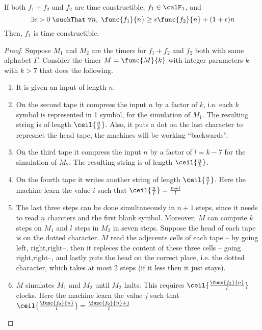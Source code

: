 \begin{theorem}
    If both \(f_1 + f_2\) and \(f_2\) are time constructible, \(f_1 \in \calF_1\), and 
    \begin{equation*}
        \exists \epsilon > 0 \; \suchThat \; \forall n,\; \func{f_1}{n} \geq \epsilon \func{f_2}{n} + (1+\epsilon)n
    \end{equation*}
    Then, \(f_1\) is time constructible.
\end{theorem}


\begin{proof}
    Suppose \(M_1\) and \(M_2\) are the timers for \(f_1+f_2\) and \(f_2\) both with same alphabet \(\Gamma\). Consider the timer \(M = \func{M}{k}\) with integer parameters \(k\) with \(k > 7\) that does the following.
    \begin{enumerate}
        \item It is given an input of length \(n\).
        \item On the second tape it compress the input \(n\) by a factor of \(k\), i.e. each \(k\) symbol is represented in 1 symbol, for the simulation of \(M_1\). The resulting string is of length \(\ceil{\frac{n}{k}}\). Also, it puts a dot on the last character to represnet the head tape, the machines will be working ``backwards''.
        \item On the third tape it compress the input \(n\) by a factor of \(l = k-7\) for the simulation of \(M_2\). The resulting string is of length \(\ceil{\frac{n}{k}}\). 
        \item On the fourth tape it writes another string of length  \(\ceil{\frac{n}{l}}\). Here the machine learn the value \(i\) such that \(\ceil{\frac{n}{l}} = \frac{n+i}{l}\)
        \item The last three steps can be done simultaneously in \(n +1\) steps, since it needs to read \(n\) charcters and the first blank symbol. Moreover, \(M\) can compute \(k\) steps on \(M_1\) and \(l\) steps in \(M_2\) in seven steps. Suppose the head of each tape is on the dotted character. \(M\) read the adjecents cells of each tape -- by going left, right,right--, then it repleces the content of these three cells -- going right,right--, and lastly puts the head on the correct place, i.e. the dotted character, which takes at most 2 steps (if it less then it just stays).
        \item \(M\) simulates \(M_1\) and \(M_2\) until \(M_2\) halts. This requires \(\ceil{\frac{\func{f_2}{n}}{l}}\) clocks. Here the machine learn the value \(j\) such that \(\ceil{\frac{\func{f_2}{n}}{l}} = \frac{\func{f_2}{n}+j}{l}\)

\end{enumerate}
\end{proof}
